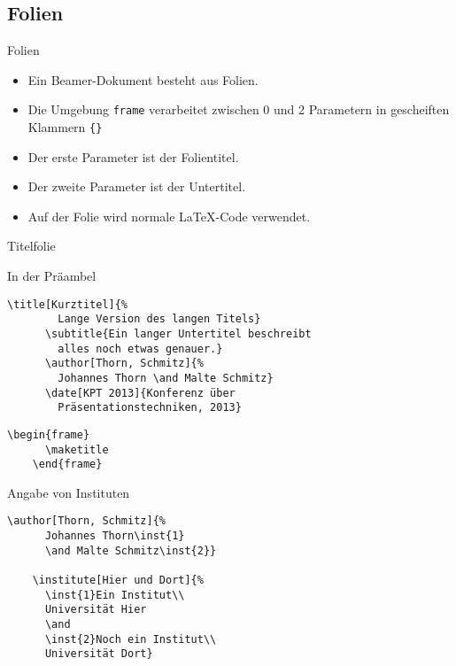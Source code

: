 
\subsection{Folien}

\begin{Frame}[fragile]{Folien}
  \begin{itemize}
    \item Ein Beamer-Dokument besteht aus Folien.
    \item Die Umgebung \lstinline-frame- verarbeitet
      zwischen 0 und 2 Parametern in gescheiften Klammern \lstinline-{}-
    \item Der erste Parameter ist der Folientitel.
    \item Der zweite Parameter ist der Untertitel.
    \item Auf der Folie wird normale \LaTeX-Code verwendet.
  \end{itemize}
\end{Frame}

\begin{Frame}[fragile]{Titelfolie}
  \begin{Block}{In der Präambel}
    \begin{lstlisting}[gobble=6,style=block]
      \title[Kurztitel]{%
        Lange Version des langen Titels}
      \subtitle{Ein langer Untertitel beschreibt
        alles noch etwas genauer.}
      \author[Thorn, Schmitz]{%
        Johannes Thorn \and Malte Schmitz}
      \date[KPT 2013]{Konferenz über
        Präsentationstechniken, 2013}
    \end{lstlisting}
  \end{Block}

  \begin{lstlisting}[gobble=4]
    \begin{frame}
      \maketitle
    \end{frame}
  \end{lstlisting}
\end{Frame}

\begin{Frame}[fragile]{Angabe von Instituten}
  \begin{lstlisting}[gobble=4]
    \author[Thorn, Schmitz]{%
      Johannes Thorn\inst{1}
      \and Malte Schmitz\inst{2}}

    \institute[Hier und Dort]{%
      \inst{1}Ein Institut\\
      Universität Hier
      \and
      \inst{2}Noch ein Institut\\
      Universität Dort}
  \end{lstlisting}
\end{Frame}

